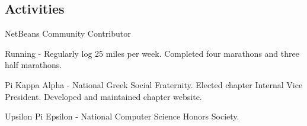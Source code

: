 \documentclass[margin,line]{resume}
\begin{document}
\begin{resume}

  \section{\mysidestyle \textcolor{mySideColor}{Activities}}

  NetBeans Community Contributor
	\vspace{-2mm}

	Running - Regularly log 25 miles per week. Completed four marathons
  and three half marathons.
	\vspace{-2mm}

  Pi Kappa Alpha - National Greek Social Fraternity. Elected chapter
  Internal Vice President. Developed and maintained chapter website.
	\vspace{-2mm}

  Upsilon Pi Epsilon - National Computer Science Honors Society.
	\vspace{-2mm}

\end{resume}
\end{document}
